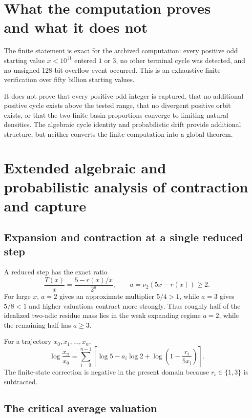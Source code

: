 \documentclass[11pt]{article}
\newcommand{\vTwo}{\nu_2}
\begin{document}
\section{What the computation proves -- and what it does not}

The finite statement is exact for the archived computation: every positive odd starting value $x<10^{11}$ entered $1$ or $3$, no other terminal cycle was detected, and no unsigned 128-bit overflow event occurred. This is an exhaustive finite verification over fifty billion starting values.

It does not prove that every positive odd integer is captured, that no additional positive cycle exists above the tested range, that no divergent positive orbit exists, or that the two finite basin proportions converge to limiting natural densities. The algebraic cycle identity and probabilistic drift provide additional structure, but neither converts the finite computation into a global theorem.

\section{Extended algebraic and probabilistic analysis of contraction and capture}

\subsection{Expansion and contraction at a single reduced step}

A reduced step has the exact ratio
\begin{equation}
\frac{T(x)}x
=
\frac{5-r(x)/x}{2^a},
\qquad
a=\vTwo(5x-r(x))\ge2.
\end{equation}
For large $x$, $a=2$ gives an approximate multiplier $5/4>1$, while $a=3$ gives $5/8<1$ and higher valuations contract more strongly. Thus roughly half of the idealized two-adic residue mass lies in the weak expanding regime $a=2$, while the remaining half has $a\ge3$.

For a trajectory $x_0,x_1,\ldots,x_n$,
\begin{equation}
\log\frac{x_n}{x_0}
=
\sum_{i=0}^{n-1}
\left[
\log5-a_i\log2+
\log\left(1-\frac{r_i}{5x_i}\right)
\right].
\end{equation}
The finite-state correction is negative in the present domain because $r_i\in\{1,3\}$ is subtracted.

\subsection{The critical average valuation}
\end{document}
